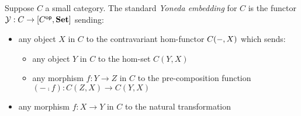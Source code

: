 Suppose $C$ a small category. The standard \emph{Yoneda embedding} for $C$ is the functor $\mathcal{Y}: C \to
[C^{\mathsf{op}},\mathbf{Set}]$ sending:
\begin{itemize}
\item any object $X$ in $C$ to the contravariant hom-functor ${C}(-,X)$ which sends:
\begin{itemize}
\item any object $Y$ in $C$ to the hom-set $C(Y,X)$
\item any morphism $f: Y \to Z$ in $C$ to the pre-composition function $(- \comp f): C(Z,X) \to C(Y,X)$
\end{itemize}
\item any morphism $f: X \to Y$ in $C$ to the natural transformation
\end{itemize}
